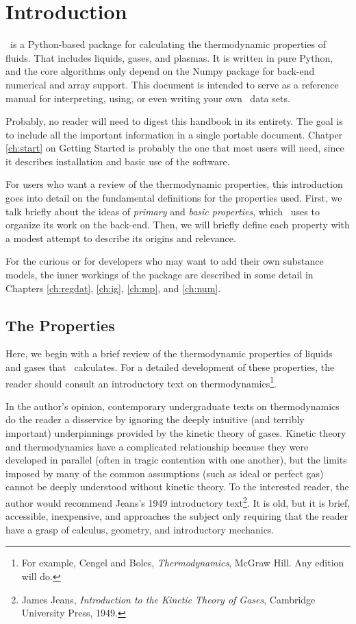 \chapter{Introduction}

\PM\ is a Python-based package for calculating the thermodynamic properties of fluids.  That includes liquids, gases, and plasmas.  It is written in pure Python, and the core algorithms only depend on the Numpy package for back-end numerical and array support.  This document is intended to serve as a reference manual for interpreting, using, or even writing your own \PM\ data sets.  

Probably, no reader will need to digest this handbook in its entirety.  The goal is to include all the important information in a single portable document.  Chatper \ref{ch:start} on Getting Started is probably the one that most users will need, since it describes installation and basic use of the software.

For users who want a review of the thermodynamic properties, this introduction goes into detail on the fundamental definitions for the properties used.  First, we talk briefly about the ideas of \emph{primary} and \emph{basic properties}, which \PM\ uses to organize its work on the back-end.  Then, we will briefly define each property with a modest attempt to describe its origins and relevance.

For the curious or for developers who may want to add their own substance models, the inner workings of the package are described in some detail in Chapters \ref{ch:regdat}, \ref{ch:ig}, \ref{ch:mp}, and \ref{ch:num}.

%
%
\section{The Properties}

Here, we begin with a brief review of the thermodynamic properties of liquids and gases that \PM\ calculates.  For a detailed development of these properties, the reader should consult an introductory text on thermodynamics\footnote{For example, Cengel and Boles, \emph{Thermodynamics}, McGraw Hill.  Any edition will do.}.  

In the author's opinion, contemporary undergraduate texts on thermodynamics do the reader a disservice by ignoring the deeply intuitive (and terribly important) underpinnings provided by the kinetic theory of gases.  Kinetic theory and thermodynamics have a complicated relationship because they were developed in parallel (often in tragic contention with one another), but the limits imposed by many of the common assumptions (such as ideal or perfect gas) cannot be deeply understood without kinetic theory.  To the interested reader, the author would recommend Jeans's 1949 introductory text\footnote{James Jeans, \emph{Introduction to the Kinetic Theory of Gases}, Cambridge University Press, 1949.}.  It is old, but it is brief, accessible, inexpensive, and approaches the subject only requiring that the reader have a grasp of calculus, geometry, and introductory mechanics.  

